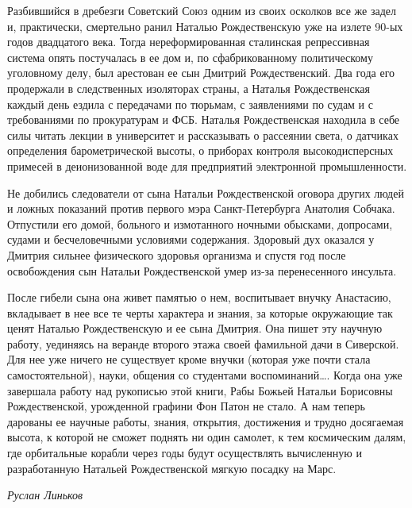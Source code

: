 Разбившийся в дребезги Советский Союз одним из своих осколков все же задел и, практически, смертельно ранил Наталью Рождественскую уже на излете 90-ых годов двадцатого века. Тогда нереформированная сталинская репрессивная система опять постучалась в ее дом и, по сфабрикованному политическому уголовному делу, был арестован ее сын Дмитрий Рождественский. Два года его продержали в следственных изоляторах страны, а Наталья Рождественская каждый день ездила с передачами по тюрьмам, с заявлениями по судам и с требованиями по прокуратурам и ФСБ. Наталья Рождественская находила в себе силы читать лекции в университет и рассказывать о рассеянии света, о датчиках определения барометрической высоты, о приборах контроля высокодисперсных примесей в деионизованной воде для предприятий электронной промышленности.

Не добились следователи от сына Натальи Рождественской оговора других людей и ложных показаний против первого мэра Санкт-Петербурга Анатолия Собчака. Отпустили его домой, больного и измотанного ночными обысками, допросами, судами и бесчеловечными условиями содержания. Здоровый дух оказался у Дмитрия сильнее физического здоровья организма и спустя год после освобождения сын Натальи Рождественской умер из-за перенесенного инсульта.

После гибели сына она живет памятью о нем, воспитывает внучку Анастасию, вкладывает в нее все те черты характера и знания, за которые окружающие так ценят Наталью Рождественскую и ее сына Дмитрия. Она пишет эту научную работу, уединяясь на веранде второго этажа своей фамильной дачи в Сиверской. Для нее уже ничего не существует кроме внучки (которая уже почти стала самостоятельной), науки, общения со студентами воспоминаний…. Когда она уже завершала работу над рукописью этой книги, Рабы Божьей Натальи Борисовны Рождественской, урожденной графини Фон Патон не стало. А нам теперь дарованы ее научные работы, знания, открытия, достижения и трудно досягаемая высота, к которой не сможет поднять ни один самолет, к тем космическим далям, где орбитальные корабли через годы будут осуществлять вычисленную и разработанную Натальей Рождественской мягкую посадку на Марс.


\vskip 4mm
\hfill{\it Руслан Линьков}


